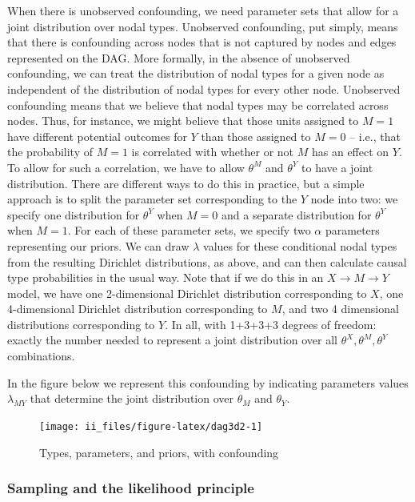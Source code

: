 \documentclass[
  12pt,
]{book}
\begin{document}
When there is unobserved confounding, we need parameter sets that allow for a joint distribution over nodal types. Unobserved confounding, put simply, means that there is confounding across nodes that is not captured by nodes and edges represented on the DAG. More formally, in the absence of unobserved confounding, we can treat the distribution of nodal types for a given node as independent of the distribution of nodal types for every other node. Unobserved confounding means that we believe that nodal types may be correlated across nodes. Thus, for instance, we might believe that those units assigned to \(M=1\) have different potential outcomes for \(Y\) than those assigned to \(M=0\) -- i.e., that the probability of \(M=1\) is correlated with whether or not \(M\) has an effect on \(Y\). To allow for such a correlation, we have to allow \(\theta^M\) and \(\theta^Y\) to have a joint distribution. There are different ways to do this in practice, but a simple approach is to split the parameter set corresponding to the \(Y\) node into two: we specify one distribution for \(\theta^Y\) when \(M=0\) and a separate distribution for \(\theta^Y\) when \(M=1\). For each of these parameter sets, we specify two \(\alpha\) parameters representing our priors. We can draw \(\lambda\) values for these conditional nodal types from the resulting Dirichlet distributions, as above, and can then calculate causal type probabilities in the usual way. Note that if we do this in an \(X \rightarrow M \rightarrow Y\) model, we have one 2-dimensional Dirichlet distribution corresponding to \(X\), one 4-dimensional Dirichlet distribution corresponding to \(M\), and two 4 dimensional distributions corresponding to \(Y\). In all, with 1+3+3+3 degrees of freedom: exactly the number needed to represent a joint distribution over all \(\theta^X, \theta^M, \theta^Y\) combinations.

In the figure below we represent this confounding by indicating parameters values \(\lambda_{MY}\) that determine the joint distribution over \(\theta_M\) and \(\theta_Y\).

\begin{figure}
\texttt{[image: ii\_files/figure-latex/dag3d2-1]} \caption{Types, parameters, and priors, with confounding}\label{fig:dag3d2}
\end{figure}

\hypertarget{sampling-and-the-likelihood-principle}{%
\subsubsection{Sampling and the likelihood principle}\label{sampling-and-the-likelihood-principle}}
\end{document}
